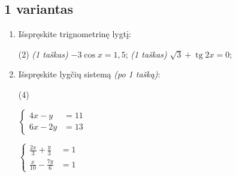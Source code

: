 \documentclass[a4paper]{article}
\DeclareMathOperator{\tg}{tg}
\begin{document}
\subsection*{1 variantas}

\begin{enumerate}
      \item Išspręskite trignometrinę lygtį:
            \begin{tasks}[item-format={\normalfont}, after-item-skip=4mm](2)
                  \task \textit{(1 taškas)} $-3\cos{x}=1,5$;
                  \task \textit{(1 taškas)} $\sqrt{3}+\tg{2x}=0$;
            \end{tasks}

      \item Išspręskite lygčių sistemą \textit{(po 1 tašką)}:
            \begin{tasks}[item-format={\normalfont}, after-item-skip=4mm](4)
                  \task   \par\vspace{-1.3\baselineskip}%
                  $\left\{\begin{aligned}
                              4x - y  & = 11 \\
                              6x - 2y & = 13
                        \end{aligned}\right.$

                  \task   \par\vspace{-1.3\baselineskip}%
                  $\left\{\begin{aligned}
                              \frac{2x}{3} + \frac{y}{3}  & = 1 \\
                              \frac{x}{10} - \frac{7y}{6} & = 1
                        \end{aligned}\right.$


\end{tasks}
\end{enumerate}
\end{document}
